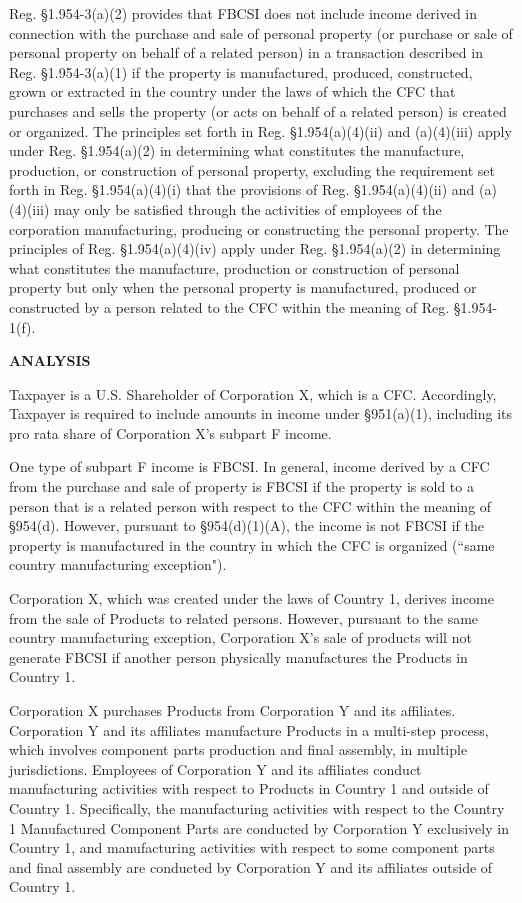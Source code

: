 \begin{select}
 Reg. \S1.954-3(a)(2) provides that FBCSI does not include income derived in connection with the purchase and sale of personal property (or purchase or sale of personal property on behalf of a related person) in a transaction described in  Reg. \S1.954-3(a)(1) if the property is manufactured, produced, constructed, grown or extracted in the country under the laws of which the CFC that purchases and sells the property (or acts on behalf of a related person) is created or organized. The principles set forth in  Reg. \S1.954(a)(4)(ii) and (a)(4)(iii) apply under  Reg. \S1.954(a)(2) in determining what constitutes the manufacture, production, or construction of personal property, excluding the requirement set forth in  Reg. \S1.954(a)(4)(i) that the provisions of  Reg. \S1.954(a)(4)(ii) and (a)(4)(iii) may only be satisfied through the activities of employees of the corporation manufacturing, producing or constructing the personal property. The principles of  Reg. \S1.954(a)(4)(iv) apply under Reg. \S1.954(a)(2) in determining what constitutes the manufacture, production or construction of personal property but only when the personal property is manufactured, produced or constructed by a person related to the CFC within the meaning of  Reg. \S1.954-1(f).
 
 
\begin{center} \textbf{ANALYSIS}
\end{center}

 
Taxpayer is a U.S. Shareholder of Corporation X, which is a CFC. Accordingly, Taxpayer is required to include amounts in income under \S951(a)(1), including its pro rata share of Corporation X's subpart F income.
 
 One type of subpart F income is FBCSI. In general, income derived by a CFC from the purchase and sale of property is FBCSI if the property is sold to a person that is a related person with respect to the CFC within the meaning of \S954(d). However, pursuant to \S954(d)(1)(A), the income is not FBCSI if the property is manufactured in the country in which the CFC is organized (``same country manufacturing exception").
 
 Corporation X, which was created under the laws of Country 1, derives income from the sale of Products to related persons. However, pursuant to the same country manufacturing exception, Corporation X's sale of products will not generate FBCSI if another person physically manufactures the Products in Country 1.
 
 Corporation X purchases Products from Corporation Y and its affiliates. Corporation Y and its affiliates manufacture Products in a multi-step process, which involves component parts production and final assembly, in multiple jurisdictions. Employees of Corporation Y and its affiliates conduct manufacturing activities with respect to Products in Country 1 and outside of Country 1. Specifically, the manufacturing activities with respect to the Country 1 Manufactured Component Parts are conducted by Corporation Y exclusively in Country 1, and manufacturing activities with respect to some component parts and final assembly are conducted by Corporation Y and its affiliates outside of Country 1.
 

\end{select}

